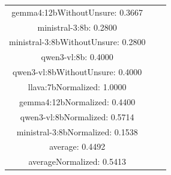 \documentclass[a4paper]{article}
\begin{document}
\begin{tabular}{ccc}
gemma4:12bWithoutUnsure: 0.3667 \\ ministral-3:8b: 0.2800 \\ ministral-3:8bWithoutUnsure: 0.2800 \\ qwen3-vl:8b: 0.4000 \\ qwen3-vl:8bWithoutUnsure: 0.4000 \\ llava:7bNormalized: 1.0000 \\ gemma4:12bNormalized: 0.4400 \\ qwen3-vl:8bNormalized: 0.5714 \\ ministral-3:8bNormalized: 0.1538 \\ average: 0.4492 \\ averageNormalized: 0.5413 \end{minipage}\\
\end{tabular}

\vspace{5mm}
\end{document}
